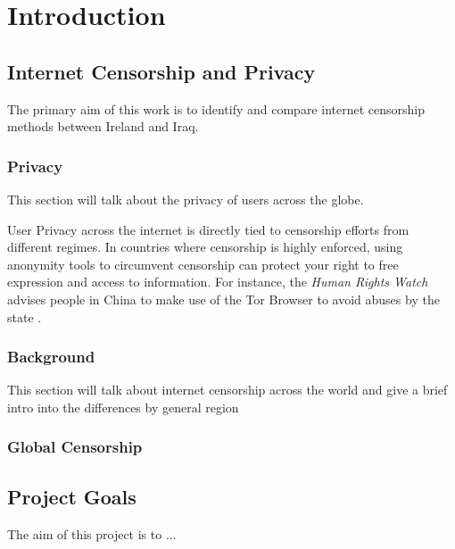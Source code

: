 \chapter{Introduction}

\section{Internet Censorship and Privacy}

The primary aim of this work is to identify and compare internet censorship methods between Ireland and Iraq. 

\subsection{Privacy}
This section will talk about the privacy of users across the globe.

User Privacy across the internet is directly tied to censorship efforts from different regimes. In countries where censorship is highly enforced, using anonymity tools to circumvent censorship can protect your right to free expression and access to information. For instance, the \textit{Human Rights Watch} advises people in China to make use of the Tor Browser to avoid abuses by the state \cite{Privacy2017}. 

\subsection{Background}

This section will talk about internet censorship across the world and give a brief intro into the differences by general region

\subsection{Global Censorship}

\section{Project Goals}

The aim of this project is to ...


